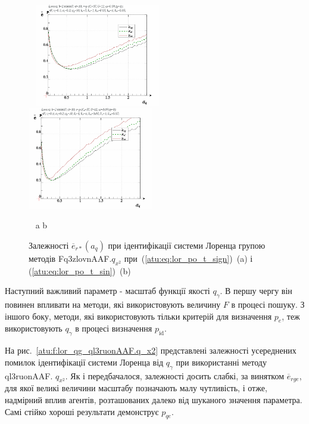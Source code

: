 \begin{figure}[ht!]
  \begin{center}
    ~ \hfill
    \includegraphics[width=0.49\textwidth]{p/cha/lor/Fq3zlovnAAF/lor_Fq3zlovnAAF_qx2-p_a_q_e_sign.png}
    \hfill
    \includegraphics[width=0.49\textwidth]{p/cha/lor/Fq3zlovnAAF/lor_Fq3zlovnAAF_qx2-p_a_q_e_sin.png}
    \hfill ~
  \end{center}
  \vspace{-1.0ex}
  \begin{center}
    ~ \hfill a \hfill\hfill b \hfill ~
  \end{center}
  \vspace{-1.5ex}
  \caption{Залежності $ \overline{e}_{r *} (a_q) $ при ідентифікації системи Лоренца групою методів Fq3zlovnAAF.$q_{x^2} $ при~(\ref{atu:eq:lor_po_t_sign})~(a) і (\ref{atu:eq:lor_po_t_sin})~(b)}
\label{atu:f:lor_a_q_Fq3zlovnAAF.q_x2}
\end{figure}


Наступний важливий параметр - масштаб функції якості
$ q_\gamma $. В першу чергу він повинен впливати на методи, які
використовують величину
$ F $ в процесі пошуку. З іншого боку, методи, які використовують
тільки критерій для визначення
$ p_e $, теж використовують
$ q_\gamma $ в процесі визначення
$ p_\mathrm{id} $.

На рис.~\ref{atu:f:lor_qg_ql3ruonAAF.q_x2} представлені залежності усереднених
помилок ідентифікації системи Лоренца від
$ q_\gamma $ при використанні методу ql3ruonAAF.
$ q_{x^2} $. Як і передбачалося, залежності досить слабкі, за винятком
$ \overline{e}_{rge} $, для якої великі величини масштабу позначають малу
чутливість, і отже, надмірний вплив агентів, розташованих далеко
від шуканого значення параметра. Самі стійко хороші результати
демонструє
$ p_{qe} $.

